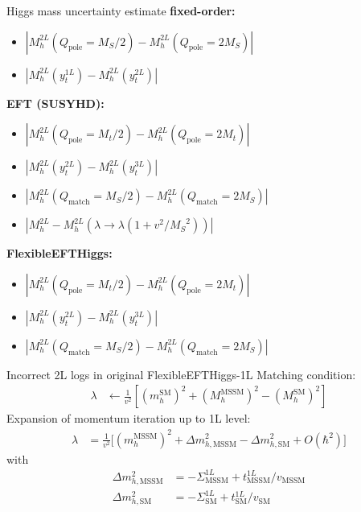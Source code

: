\documentclass[hyperref={pdfpagelabels=false},ngerman]{beamer}
\newcommand{\MS}{\ensuremath{M_S}}
\renewcommand{\emph}{\textbf}
\newcommand{\SM}{\ensuremath{\text{SM}}}
\newcommand{\MSSM}{\ensuremath{\text{MSSM}}}
\newcommand{\pole}{\ensuremath{\text{pole}}}
\begin{document}

\begin{frame}[noframenumbering]{Higgs mass uncertainty estimate}
  \emph{fixed-order:}
  \begin{itemize}
  \item $|M_h^{2L}(Q_\pole = \MS/2) - M_h^{2L}(Q_\pole = 2\MS)|$
  \item $|M_h^{2L}(y_t^{1L}) - M_h^{2L}(y_t^{2L})|$
  \end{itemize}
  \emph{EFT (SUSYHD):}
  \begin{itemize}
  \item $|M_h^{2L}(Q_\pole = M_t/2) - M_h^{2L}(Q_\pole = 2M_t)|$
  \item $|M_h^{2L}(y_t^{2L}) - M_h^{2L}(y_t^{3L})|$
  \item $|M_h^{2L}(Q_{\text{match}} = \MS/2) - M_h^{2L}(Q_{\text{match}} = 2\MS)|$
  \item $|M_h^{2L} - M_h^{2L}(\lambda \rightarrow \lambda(1 + v^2/\MS^2))|$
  \end{itemize}
  \emph{FlexibleEFTHiggs:}
  \begin{itemize}
  \item $|M_h^{2L}(Q_\pole = M_t/2) - M_h^{2L}(Q_\pole = 2M_t)|$
  \item $|M_h^{2L}(y_t^{2L}) - M_h^{2L}(y_t^{3L})|$
  \item $|M_h^{2L}(Q_{\text{match}} = \MS/2) - M_h^{2L}(Q_{\text{match}} = 2\MS)|$
  \end{itemize}
\end{frame}


\begin{frame}[noframenumbering]{Incorrect 2L logs in original FlexibleEFTHiggs-1L}
  Matching condition:
  \begin{align*}
    \lambda &\leftarrow \frac{1}{v^2} \left[
      (m_h^\SM)^2 + (M_h^\text{MSSM})^2 - (M_h^\SM)^2
    \right]
  \end{align*}
  Expansion of momentum iteration up to 1L level:
  \begin{align*}
    \lambda &= \frac{1}{v^2} \Big[
      (m_h^\MSSM)^2
      + \Delta m_{h,\MSSM}^2
      - \Delta m_{h,\SM}^2
      + O(\hbar^2)
    \Big]
  \end{align*}
  with
  \begin{align*}
    \Delta m_{h,\MSSM}^2 &= -\Sigma^{1L}_{\MSSM} + t_{\MSSM}^{1L}/v_\MSSM \\
    \Delta m_{h,\SM}^2 &= -\Sigma^{1L}_{\SM} + t^{1L}_{\SM}/v_\SM
  \end{align*}
\end{frame}
\end{document}
